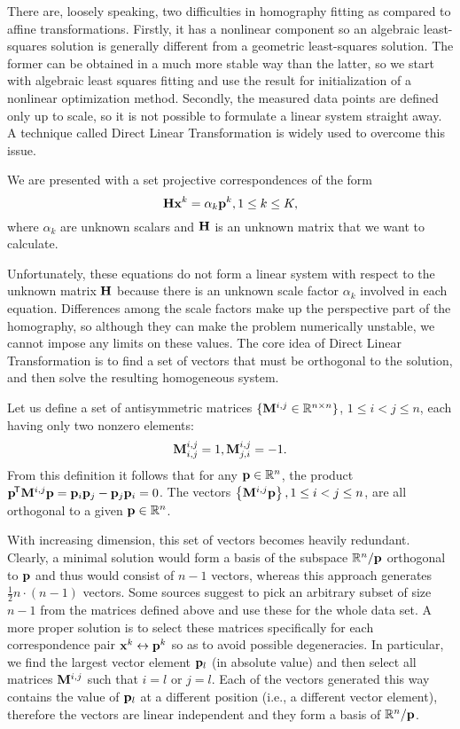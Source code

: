 There are, loosely speaking, two difficulties in homography fitting as compared to affine transformations.
Firstly, it has a nonlinear component so an algebraic least-squares solution is generally different from a geometric least-squares solution.
The former can be obtained in a much more stable way than the latter, so we start with algebraic least squares fitting and use the result for initialization of a nonlinear optimization method.
Secondly, the measured data points are defined only up to scale, so it is not possible to formulate a linear system straight away.
A technique called Direct Linear Transformation is widely used to overcome this issue.

We are presented with a set projective correspondences of the form
$$\mathbf{H} \mathbf{x}^k = \alpha_k \mathbf{p}^k, 1 \leq k \leq K,$$
where $\alpha_k$ are unknown scalars and $\mathbf{H}$ is an unknown matrix that we want to calculate.

Unfortunately, these equations do not form a linear system with respect to the unknown matrix $\mathbf{H}$ because there is an unknown scale factor $\alpha_k$ involved in each equation.
Differences among the scale factors make up the perspective part of the homography, so although they can make the problem numerically unstable, we cannot impose any limits on these values.
The core idea of Direct Linear Transformation is to find a set of vectors that must be orthogonal to the solution, and then solve the resulting homogeneous system.

Let us define a set of antisymmetric matrices $\{\mathbf{M}^{i, j} \in \mathbb{R}^{n \times n}\}$, $1 \leq i < j \leq n$, each having only two nonzero elements:
$$\mathbf{M}^{i, j}_{i, j} = 1,
\mathbf{M}^{i, j}_{j, i} = -1.$$
From this definition it follows that for any $\mathbf{p} \in \mathbb{R}^n$, the product $\mathbf{p}^{\!\mathsf{T}} \mathbf{M}^{i, j} \mathbf{p} = \mathbf{p}_{i} \mathbf{p}_{j} - \mathbf{p}_{j} \mathbf{p}_{i} = 0$.
The vectors $\left\{ \mathbf{M}^{i, j} \mathbf{p} \right\}, 1 \leq i < j \leq n$, are all orthogonal to a given $\mathbf{p} \in \mathbb{R}^n$.

With increasing dimension, this set of vectors becomes heavily redundant.
Clearly, a minimal solution would form a basis of the subspace $\mathbb{R}^n / \mathbf{p}$ orthogonal to $\mathbf{p}$ and thus would consist of $n - 1$ vectors, whereas this approach generates $\frac {1} {2} n \cdot (n - 1)$ vectors.
Some sources\cite{MVG} suggest to pick an arbitrary subset of size $n - 1$ from the matrices defined above and use these for the whole data set.
A more proper solution is to select these matrices specifically for each correspondence pair $\mathbf{x}^k \leftrightarrow \mathbf{p}^k$ so as to avoid possible degeneracies.
In particular, we find the largest vector element $\mathbf{p}_l$ (in absolute value) and then select all matrices $\mathbf{M}^{i, j}$ such that $i = l$ or $j = l$.
Each of the vectors generated this way contains the value of $\mathbf{p}_l$ at a different position (i.e., a different vector element), therefore the vectors are linear independent and they form a basis of $\mathbb{R}^n / \mathbf{p}$.

